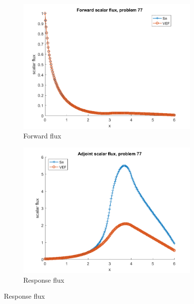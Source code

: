 \documentclass{article}
\begin{document}
\begin{figure}[H]
\label{Case77Flux}
\centering
\begin{subfigure}{.5\textwidth}
  \centering
  \includegraphics[width=.98\linewidth]{IanProposal/figures2/77phi.png}
  \caption{Forward flux}
  \label{fig:sfig1}
\end{subfigure}%
\begin{subfigure}{.5\textwidth}
  \centering
  \includegraphics[width=.98\linewidth]{IanProposal/figures2/77phia.png}
  \caption{Response flux}
  \label{fig:sfig4}
\end{subfigure}%
\end{figure}
\end{document}
